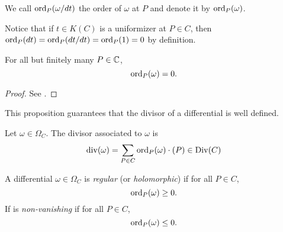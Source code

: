 \begin{definition}
	We call $\operatorname{ord}_P(\omega/dt)$ the order of $\omega$ at $P$ and denote it by
	$\operatorname{ord}_P(\omega)$.
\end{definition}

Notice that if $t \in K(C)$ is a uniformizer at $P \in C$, then
$\operatorname{ord}_P(dt) = \operatorname{ord}_P(dt/dt) = \operatorname{ord}_P(1) = 0$ by definition.

\begin{proposition}
	For all but finitely many $P \in \mathbb{C}$, 
	\begin{equation*}
		\operatorname{ord}_P(\omega) = 0.
	\end{equation*}
\end{proposition}

\begin{proof}
	See \cite[II.4.3(e)]{silverman}.
\end{proof}

This proposition guarantees that the divisor of a differential is
well defined.
\begin{definition}
	Let $\omega \in \Omega_C$. The divisor associated to $\omega$ is
	\begin{equation*}
		\operatorname{div}(\omega) = \sum_{P \in C} \operatorname{ord}_P(\omega)\cdot (P) \in \operatorname{Div}(C)
	\end{equation*}
\end{definition}


\begin{definition}
	A differential $\omega \in \Omega_C$ is \emph{regular} 
	(or \emph{holomorphic})
	if for all $P \in C$,
	\begin{equation*}
		\operatorname{ord}_P(\omega) \geq 0.
	\end{equation*}
	If is \emph{non-vanishing} if for all $P \in C$,
	\begin{equation*}
		\operatorname{ord}_P(\omega) \leq 0.
	\end{equation*}
\end{definition}


